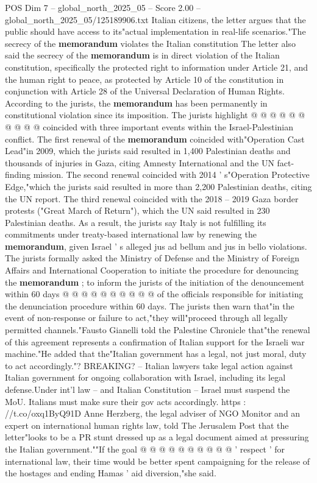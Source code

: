 \begin{textsample}{POS Dim 7 – global\_north\_2025\_05 – Score 2.00 – global\_north\_2025\_05/125189906.txt}
Italian citizens, the letter argues that the public should have access to its"actual implementation in real-life scenarios."The secrecy of the \textbf{memorandum} violates the Italian constitution The letter also said the secrecy of the \textbf{memorandum} is in direct violation of the Italian constitution, specifically the protected right to information under Article 21, and the human right to peace, as protected by Article 10 of the constitution in conjunction with Article 28 of the Universal Declaration of Human Rights.
According to the jurists, the \textbf{memorandum} has been permanently in constitutional violation since its imposition.
The jurists highlight @ @ @ @ @ @ @ @ @ @ coincided with three important events within the Israel-Palestinian conflict.
The first renewal of the \textbf{memorandum} coincided with"Operation Cast Lead"in 2009, which the jurists said resulted in 1,400 Palestinian deaths and thousands of injuries in Gaza, citing Amnesty International and the UN fact-finding mission.
The second renewal coincided with 2014 ' s"Operation Protective Edge,"which the jurists said resulted in more than 2,200 Palestinian deaths, citing the UN report.
The third renewal coincided with the 2018 -- 2019 Gaza border protests ("Great March of Return"), which the UN said resulted in 230 Palestinian deaths.
As a result, the jurists say Italy is not fulfilling its commitments under treaty-based international law by renewing the \textbf{memorandum}, given Israel ' s alleged jus ad bellum and jus in bello violations.
The jurists formally asked the Ministry of Defense and the Ministry of Foreign Affairs and International Cooperation to initiate the procedure for denouncing the \textbf{memorandum} ; to inform the jurists of the initiation of the denouncement within 60 days @ @ @ @ @ @ @ @ @ @ of the officials responsible for initiating the denunciation procedure within 60 days.
The jurists then warn that"in the event of non-response or failure to act,"they will"proceed through all legally permitted channels."Fausto Gianelli told the Palestine Chronicle that"the renewal of this agreement represents a confirmation of Italian support for the Israeli war machine."He added that the"Italian government has a legal, not just moral, duty to act accordingly."?
BREAKING? -- Italian lawyers take legal action against Italian government for ongoing collaboration with Israel, including its legal defense.Under int'l law -- and Italian Constitution -- Israel must suspend the MoU.
Italians must make sure their gov acts accordingly. https : //t.co/oxq1ByQ91D Anne Herzberg, the legal adviser of NGO Monitor and an expert on international human rights law, told The Jerusalem Post that the letter"looks to be a PR stunt dressed up as a legal document aimed at pressuring the Italian government.""If the goal @ @ @ @ @ @ @ @ @ @ ' respect ' for international law, their time would be better spent campaigning for the release of the hostages and ending Hamas ' aid diversion,"she said.

\end{textsample}
